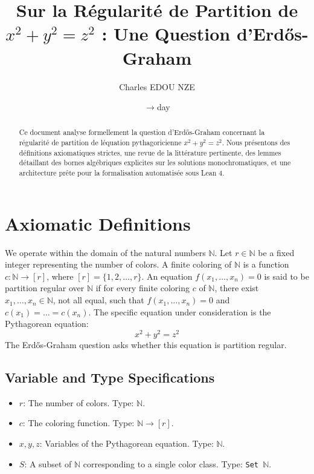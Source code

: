 \documentclass[12pt]{article}
\title{Sur la R\'egularit\'e de Partition de $x^2+y^2=z^2$ : Une Question d'Erd\H{o}s-Graham}
\author{Charles EDOU NZE}
\date{\ensuremath{\to}day}
\begin{document}
\maketitle

\begin{abstract}
Ce document analyse formellement la question d'Erd\H{o}s-Graham concernant la r\'egularit\'e de partition de l\'equation pythagoricienne $x^2+y^2=z^2$. Nous pr\'esentons des d\'efinitions axiomatiques strictes, une revue de la litt\'erature pertinente, des lemmes d\'etaillant des bornes alg\'ebriques explicites sur les solutions monochromatiques, et une architecture pr\^ete pour la formalisation automatis\'ee sous Lean 4.
\let\thefootnote\relax{}
\end{abstract}

\section{Axiomatic Definitions}
We operate within the domain of the natural numbers $\ensuremath{\mathbb{N}}$. Let $r \in \ensuremath{\mathbb{N}}$ be a fixed integer representing the number of colors.
A finite coloring of $\ensuremath{\mathbb{N}}$ is a function $c: \ensuremath{\mathbb{N}} \ensuremath{\to} [r]$, where $[r] = \{1, 2, \dots, r\}$.
An equation $f(x_1, \dots, x_n) = 0$ is said to be partition regular over $\ensuremath{\mathbb{N}}$ if for every finite coloring $c$ of $\ensuremath{\mathbb{N}}$, there exist $x_1, \dots, x_n \in \ensuremath{\mathbb{N}}$, not all equal, such that $f(x_1, \dots, x_n) = 0$ and $c(x_1) = \dots = c(x_n)$.
The specific equation under consideration is the Pythagorean equation:
\[ x^2 + y^2 = z^2 \]
The Erd\H{o}s-Graham question asks whether this equation is partition regular.

\subsection{Variable and Type Specifications}
\begin{itemize}
    \item $r$: The number of colors. Type: $\ensuremath{\mathbb{N}}$.
    \item $c$: The coloring function. Type: $\ensuremath{\mathbb{N}} \ensuremath{\to} [r]$.
    \item $x, y, z$: Variables of the Pythagorean equation. Type: $\ensuremath{\mathbb{N}}$.
    \item $S$: A subset of $\ensuremath{\mathbb{N}}$ corresponding to a single color class. Type: \texttt{Set $\ensuremath{\mathbb{N}}$}.
\end{itemize}
\end{document}
